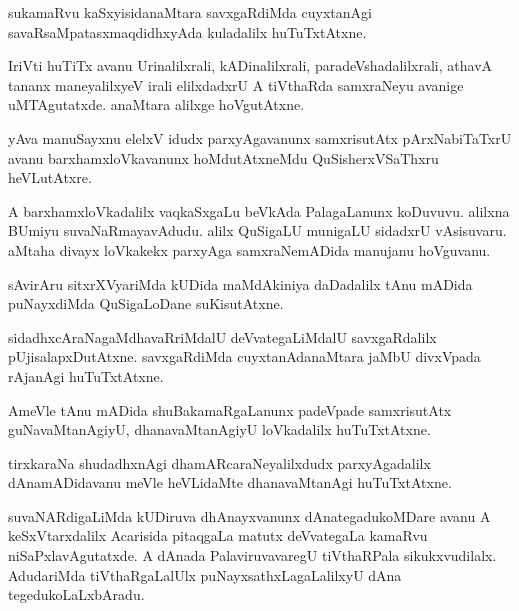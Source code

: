 \documentclass{article}
\begin{document}
\begin{mn}
sukamaRvu kaSxyisidanaMtara savxgaRdiMda cuyxtanAgi savaRsaMpatasxmaqdidhxyAda kuladalilx 
huTuTxtAtxne.
\end{mn}

\begin{mn}
IriVti huTiTx avanu Urinalilxrali, kADinalilxrali, paradeVshadalilxrali, athavA tananx 
maneyalilxyeV irali elilxdadxrU A tiVthaRda samxraNeyu avanige uMTAgutatxde. anaMtara alilxge 
hoVgutAtxne.
\end{mn}

\begin{mn}
yAva manuSayxnu elelxV idudx parxyAgavanunx samxrisutAtx pArxNabiTaTxrU avanu barxhamxloVkavanunx 
hoMdutAtxneMdu QuSisherxVSaThxru heVLutAtxre.
\end{mn}

\begin{mn}
A barxhamxloVkadalilx vaqkaSxgaLu beVkAda PalagaLanunx  koDuvuvu. alilxna BUmiyu 
suvaNaRmayavAdudu. alilx QuSigaLU munigaLU sidadxrU vAsisuvaru. aMtaha divayx loVkakekx parxyAga
samxraNemADida manujanu hoVguvanu.
\end{mn}

\begin{mn}
sAvirAru sitxrXVyariMda kUDida maMdAkiniya daDadalilx tAnu mADida puNayxdiMda QuSigaLoDane 
suKisutAtxne.
\end{mn}

\begin{mn}
sidadhxcAraNagaMdhavaRriMdalU deVvategaLiMdalU savxgaRdalilx pUjisalapxDutAtxne. savxgaRdiMda 
cuyxtanAdanaMtara jaMbU divxVpada rAjanAgi huTuTxtAtxne.
\end{mn}

\begin{mn}
AmeVle tAnu mADida shuBakamaRgaLanunx padeVpade samxrisutAtx guNavaMtanAgiyU, dhanavaMtanAgiyU 
loVkadalilx huTuTxtAtxne.
\end{mn}

\begin{mn}
tirxkaraNa shudadhxnAgi dhamARcaraNeyalilxdudx parxyAgadalilx dAnamADidavanu meVle heVLidaMte 
dhanavaMtanAgi huTuTxtAtxne.
\end{mn}

\begin{mn}
suvaNARdigaLiMda kUDiruva dhAnayxvanunx dAnategadukoMDare avanu A keSxVtarxdalilx Acarisida 
pitaqgaLa matutx deVvategaLa kamaRvu niSaPxlavAgutatxde. A dAnada PalaviruvavaregU tiVthaRPala 
sikukxvudilalx. AdudariMda tiVthaRgaLalUlx puNayxsathxLagaLalilxyU dAna tegedukoLaLxbAradu.
\end{mn}
\end{document}
